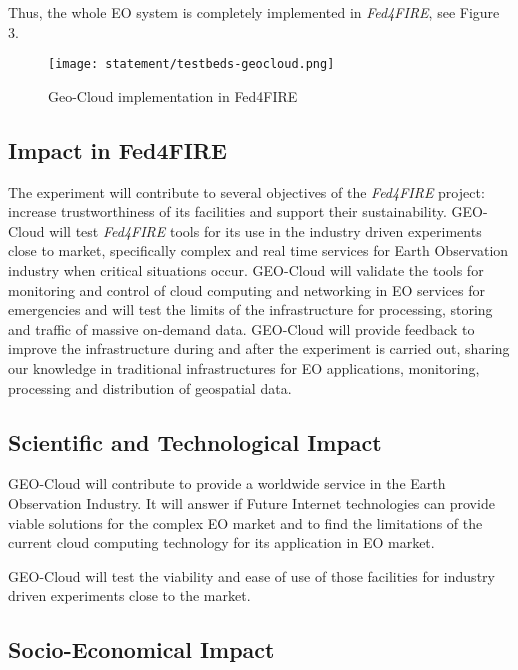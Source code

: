 Thus, the whole \ac{EO} system is completely implemented in \emph{Fed4FIRE}, see Figure 3.

\begin{figure}[!h]
\begin{center}
\texttt{[image: statement/testbeds-geocloud.png]}
\caption{Geo-Cloud implementation in Fed4FIRE}
\label{fig:intr-testbeds-geocloud}
\end{center}
\end{figure}




\subsection{Impact in Fed4FIRE}
The experiment will contribute to several objectives of the \emph{Fed4FIRE} project:
increase trustworthiness of its facilities and support their
sustainability. GEO-Cloud will test \emph{Fed4FIRE} tools for its use in the industry
driven experiments close to market, specifically complex and real time services
for Earth Observation industry when critical situations occur. 
GEO-Cloud will validate the tools for monitoring and control of cloud computing
and networking in EO services for emergencies and will test the limits of the
infrastructure for processing, storing and traffic of massive on-demand
data. GEO-Cloud will provide feedback to improve the infrastructure during and
after the experiment is carried out, sharing our knowledge in traditional
infrastructures for \ac{EO} applications, monitoring, processing and
distribution of geospatial data.

\subsection{Scientific and Technological Impact}

GEO-Cloud will contribute to provide a worldwide service in the Earth
Observation Industry. It will answer if Future Internet technologies can provide
viable solutions for the complex \ac{EO} market and to find the limitations of
the current cloud computing technology for its application in \ac{EO} market.
 
GEO-Cloud will test the viability and ease of use of those facilities for
industry driven experiments close to the market.

\subsection{Socio-Economical Impact}

